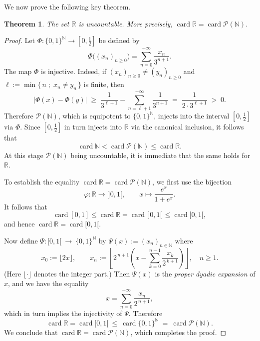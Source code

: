 \documentclass[12pt]{article}
\newtheorem{theorem}{Theorem}[section]
\theoremstyle{definition}
\begin{document}
We now prove the following key theorem.

\begin{theorem}
The set $\mathbb R$ is uncountable.
More precisely, $\operatorname{card}\mathbb R=\operatorname{card}\mathcal P(\mathbb N)$.
\end{theorem}

\begin{proof}
Let $\Phi:\{0,1\}^{\mathbb N}\longrightarrow [0,\tfrac12]$ be defined by
\[
\Phi\bigl((x_n)_{n\ge 0}\bigr)=\sum_{n=0}^{+\infty}\frac{x_n}{3^{n+1}}.
\]
The map $\Phi$ is injective.
Indeed, if $(x_n)_{n\ge 0}\ne (y_n)_{n\ge 0}$ and $\ell:=\min\{\,n\;;\; x_n\ne y_n\,\}$ is finite, then
\[
\bigl|\Phi(x)-\Phi(y)\bigr|
\;\ge\;
\frac{1}{3^{\ell+1}}-\sum_{n=\ell+1}^{+\infty}\frac{1}{3^{n+1}}
\;=\;
\frac{1}{2\cdot3^{\ell+1}}
\;>\;0.
\]
Therefore $\mathcal P(\mathbb N)$, which is equipotent to $\{0,1\}^{\mathbb N}$, injects into the interval $[0,\tfrac12]$ via $\Phi$.
Since $[0,\tfrac12]$ in turn injects into $\mathbb R$ via the canonical inclusion, it follows that
\[
\operatorname{card}\mathbb N < \operatorname{card}\mathcal P(\mathbb N)\le \operatorname{card}\mathbb R.
\]
At this stage $\mathcal P(\mathbb N)$ being uncountable, it is immediate that the same holds for $\mathbb R$.

To establish the equality $\operatorname{card}\mathbb R=\operatorname{card}\mathcal P(\mathbb N)$, we first use the bijection
\[
\varphi:\mathbb R\longrightarrow\,]0,1[,\qquad
x\longmapsto \frac{e^x}{1+e^x}.
\]
It follows that
\[
\operatorname{card}[0,1]\le \operatorname{card}\mathbb R=\operatorname{card}\,]0,1[\,\le \operatorname{card}[0,1[,
\]
and hence $\operatorname{card}\mathbb R=\operatorname{card}[0,1[$.

Now define $\Psi:[0,1[\ \longrightarrow\ \{0,1\}^{\mathbb N}$ by $\Psi(x):=(x_n)_{n\in\mathbb N}$ where
\[
x_0:=\lfloor 2x\rfloor,\qquad
x_n:=\left\lfloor 2^{\,n+1}\!\left(x-\sum_{k=0}^{n-1}\frac{x_k}{2^{\,k+1}}\right)\right\rfloor,\quad n\ge 1.
\]
(Here $\lfloor\cdot\rfloor$ denotes the integer part.)
Then $\Psi(x)$ is the \emph{proper dyadic expansion} of $x$, and we have the equality
\[
x=\sum_{n=0}^{+\infty}\frac{x_n}{2^{\,n+1}},
\]
which in turn implies the injectivity of $\Psi$.
Therefore
\[
\operatorname{card}\mathbb R=\operatorname{card}[0,1[\ \le\ \operatorname{card}\{0,1\}^{\mathbb N}\ =\ \operatorname{card}\mathcal P(\mathbb N).
\]
We conclude that $\operatorname{card}\mathbb R=\operatorname{card}\mathcal P(\mathbb N)$, which completes the proof.
\end{proof}
\end{document}

